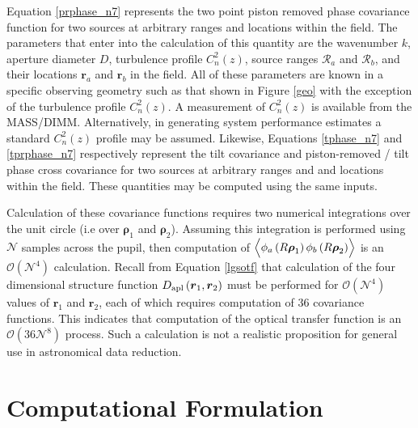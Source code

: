 Equation \ref{prphase_n7} represents the two point piston removed
phase covariance function for two sources at arbitrary ranges and
locations within the field.  The parameters that enter into the
calculation of this quantity are the wavenumber $k$, aperture diameter
$D$, turbulence profile $C_{n}^{2}(z)$, source ranges
$\mathcal{R}_{a}$ and $\mathcal{R}_{b}$, and their locations
$\boldsymbol{r}_{a}$ and $\boldsymbol{r}_{b}$ in the field.  All of
these parameters are known in a specific observing geometry such as
that shown in Figure \ref{geo} with the exception of the turbulence
profile $C_{n}^{2}(z)$.  A measurement of $C_{n}^{2}(z)$ is available
from the MASS/DIMM.  Alternatively, in generating system performance
estimates a standard $C_{n}^{2}(z)$ profile may be assumed.  Likewise,
Equations \ref{tphase_n7} and \ref{tprphase_n7} respectively represent
the tilt covariance and piston-removed / tilt phase cross covariance
for two sources at arbitrary ranges and and locations within the
field.  These quantities may be computed using the same inputs.

Calculation of these covariance functions requires two numerical
integrations over the unit circle (i.e over $\boldsymbol{\rho}_{1}$
and $\boldsymbol{\rho}_{2}$).  Assuming this integration is performed
using $\mathcal{N}$ samples across the pupil, then computation of
$\left\langle \vphantom{\hat{\phi}_{a}}
\phi_{a}\left(R\boldsymbol{\rho}_{1}\right)
\phi_{b}\left(R\boldsymbol{\rho}_{2}\right)\right\rangle$ is an
$\mathcal{O}(\mathcal{N}^{4})$ calculation.  Recall from Equation
\ref{lgsotf} that calculation of the four dimensional structure
function $D_{\rm apl}\left(\boldsymbol{r}_{1},
\boldsymbol{r}_{2}\right)$ must be performed for
$\mathcal{O}(\mathcal{N}^{4})$ values of $\boldsymbol{r}_{1}$ and
$\boldsymbol{r}_{2}$, each of which requires computation of 36
covariance functions.  This indicates that computation of the optical
transfer function is an $\mathcal{O}(36\mathcal{N}^{8})$ process.
Such a calculation is not a realistic proposition for general use in
astronomical data reduction.

\section{Computational Formulation}
\label{sec:compcovariance}

